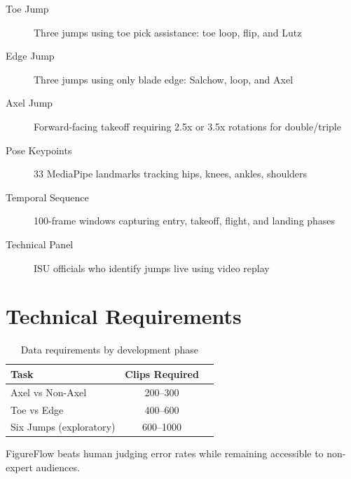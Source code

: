 \begin{description}
\item[Toe Jump] Three jumps using toe pick assistance: toe loop, flip, and Lutz
\item[Edge Jump] Three jumps using only blade edge: Salchow, loop, and Axel  
\item[Axel Jump] Forward-facing takeoff requiring 2.5x or 3.5x rotations for double/triple
\item[Pose Keypoints] 33 MediaPipe landmarks tracking hips, knees, ankles, shoulders
\item[Temporal Sequence] 100-frame windows capturing entry, takeoff, flight, and landing phases
\item[Technical Panel] ISU officials who identify jumps live using video replay
\end{description}

\section{Technical Requirements}
\label{section:requirements}

\begin{table}[h]
\centering
\begin{tabular}{|l|c|c|}
\hline
\textbf{Task} & \textbf{Clips Required} \\
\hline
Axel vs Non-Axel & 200--300 \\
Toe vs Edge & 400--600 \\
Six Jumps (exploratory) & 600--1000 \\
\hline
\end{tabular}
\caption{Data requirements by development phase}
\end{table}

FigureFlow beats human judging error rates while remaining accessible to non-expert audiences.

